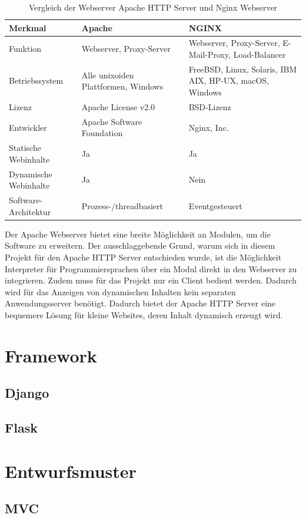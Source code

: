 \newlength{\colWidth}
\setlength{\colWidth}{0.33\textwidth}
\begin{table}[htbp]
	\centering
	\begin{tabular}{p{\colWidth}p{\colWidth} p{\colWidth}}
		\hline
		Merkmal & Apache & NGINX \\
		\hline
		Funktion & Webserver, Proxy-Server & Webserver, Proxy-Server, E-Mail-Proxy, Load-Balancer \\
		Betriebssystem & Alle unixoiden Plattformen, Windows & FreeBSD, Linux, Solaris, IBM AIX, HP-UX, macOS, Windows \\
		Lizenz & Apache License v2.0 & \acs{BSD}-Lizenz \\
		Entwickler & Apache Software Foundation & Nginx, Inc. \\
		Statische Webinhalte & Ja & Ja \\
		Dynamische Webinhalte & Ja & Nein \\
		Software-Architektur & Prozess-/threadbasiert & Eventgesteuert \\
		\hline
	\end{tabular}
	\caption[Tabelle]{Vergleich der Webserver Apache HTTP Server und Nginx Webserver}
	\label{tab:ServerVergleich}
\end{table}

Der Apache Webserver bietet eine breite Möglichkeit an Modulen, um die Software zu erweitern.
Der ausschlaggebende Grund, warum sich in diesem Projekt für den Apache HTTP Server entschieden wurde, ist die Möglichkeit Interpreter für Programmiersprachen über ein Modul direkt in den Webserver zu integrieren. Zudem muss für das Projekt nur ein Client bedient werden. Dadurch wird für das Anzeigen von dynamischen Inhalten kein separaten  Anwendungsserver benötigt. Dadurch bietet der Apache HTTP Server eine bequemere Lösung für kleine Websites, deren Inhalt dynamisch erzeugt wird.





\section{Framework}

\subsection{Django}

\subsection{Flask}



\section{Entwurfsmuster}

\subsection{MVC}